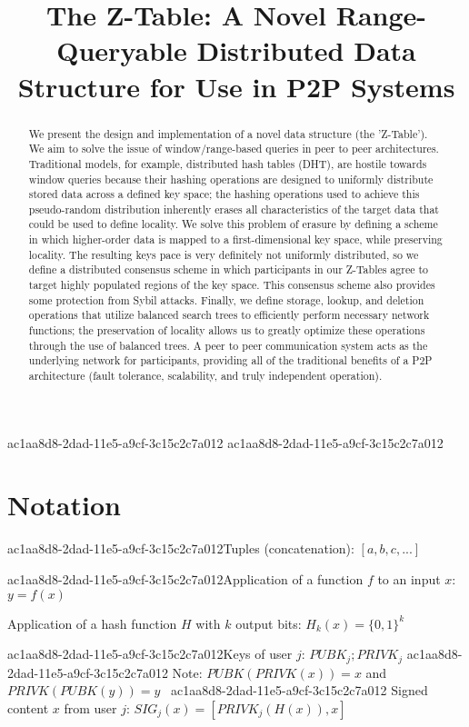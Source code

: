 \documentclass[12pt]{article}
\title{The Z-Table: A Novel Range-Queryable Distributed Data Structure for Use in P2P Systems}
\begin{document}
\maketitle

\begin{abstract}
We present the design and implementation of a novel data structure (the 'Z-Table'). We aim to solve the issue of window/range-based queries in peer to peer architectures. Traditional models, for example,  distributed hash tables (DHT), are hostile towards window queries because their hashing operations are designed to uniformly distribute stored data across a defined key space; the hashing operations used to achieve this pseudo-random distribution inherently erases all characteristics of the target data that could be used to define locality. We solve this problem of erasure by defining a scheme in which higher-order data is mapped to a first-dimensional key space, while preserving locality. The resulting keys pace is very definitely not uniformly distributed, so we define a distributed consensus scheme in which participants in our Z-Tables agree to target highly populated regions of the key space. This consensus scheme also provides some protection from Sybil attacks. Finally, we define storage, lookup, and deletion operations that utilize balanced search trees to efficiently perform necessary network functions; the preservation of locality allows us to greatly optimize these operations through the use of balanced trees. A peer to peer communication system acts as the underlying network for participants, providing all of the traditional benefits of a P2P architecture (fault tolerance, scalability, and truly independent operation).
\end{abstract}
ac1aa8d8-2dad-11e5-a9cf-3c15c2c7a012
ac1aa8d8-2dad-11e5-a9cf-3c15c2c7a012\section{Notation}

ac1aa8d8-2dad-11e5-a9cf-3c15c2c7a012Tuples (concatenation): $[a,b,c,...]$

ac1aa8d8-2dad-11e5-a9cf-3c15c2c7a012Application of a function $f$ to an input $x$: $y=f(x)$

Application of a hash function $H$ with $k$ output bits: $H_{k}(x) = \{0,1\}^k$

ac1aa8d8-2dad-11e5-a9cf-3c15c2c7a012Keys of user $j$: $ PUBK_j; PRIVK_j $
ac1aa8d8-2dad-11e5-a9cf-3c15c2c7a012
Note: $PUBK(PRIVK(x)) = x$ and $PRIVK(PUBK(y)) = y$~
ac1aa8d8-2dad-11e5-a9cf-3c15c2c7a012
Signed content $x$ from user $j$: $SIG_j(x) = \left[ PRIVK_j( H(x) ), x \right]$
\end{document}
